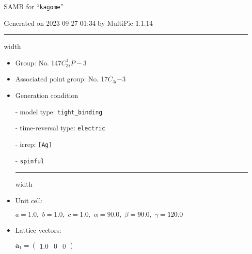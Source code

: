 \documentclass[fleqn,10pt,landscape]{article}
\begin{document}
\setcounter{MaxMatrixCols}{16}

\setlength{\baselineskip}{16pt}
\footnotesize
\begin{center}
\LARGE
SAMB for ``\texttt{kagome}''
\end{center}
\begin{flushright}
Generated on 2023-09-27 01:34 by MultiPie 1.1.14
\end{flushright}
\vspace{1cm}


 \hfil \hrule height 1mm width \textwidth \hfil

\begin{itemize}
\item Group: No. 147\quad$C_{3i}^{1}$\quad$P-3$\quad[ trigonal ]

\item Associated point group: No. 17\quad$C_{3i}$\quad$-3$\quad[ trigonal ]

\vspace{5mm}

\item Generation condition

\quad - model type: \texttt{tight_binding}

\quad - time-reversal type: \texttt{electric}

\quad - irrep: \texttt{[Ag]}

\quad - \texttt{spinful}


 \hfil \hrule height 1mm width \textwidth \hfil

\item Unit cell:

\quad $a=1.0,\,\, b=1.0,\,\, c=1.0,\,\, \alpha=90.0,\,\, \beta=90.0,\,\, \gamma=120.0$

\item Lattice vectors:

\quad $\bm{a}_1=\begin{pmatrix} 1.0 & 0 & 0 \end{pmatrix}$


\end{itemize}
\end{document}
